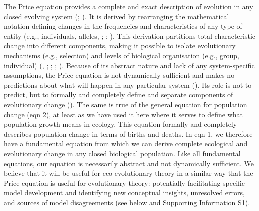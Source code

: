 \documentclass[
]{article}
\begin{document}
The Price equation provides a complete and exact description of
evolution in any closed evolving system (; ). It is derived by
rearranging the mathematical notation defining changes in the
frequencies and characteristics of any type of entity (e.g.,
individuals, alleles, ;
; ). This derivation partitions total characteristic change into
different components, making it possible to isolate evolutionary
mechanisms (e.g., selection) and levels of biological organisation
(e.g., group, individual) (,
; ; ;
). Because of its
abstract nature and lack of any system-specific assumptions, the Price
equation is not dynamically sufficient and makes no predictions about
what will happen in any particular system
(). Its role is not to predict,
but to formally and completely define and separate components of
evolutionary change (). The same is true of the general equation for population change
(eqn 2), at least as we have used it here where it serves to define what
population growth means in ecology. This equation formally and
completely describes population change in terms of births and deaths. In
eqn 1, we therefore have a fundamental equation from which we can derive
complete ecological and evolutionary change in any closed biological
population. Like all fundamental equations, our equation is necessarily
abstract and not dynamically sufficient. We believe that it will be
useful for eco-evolutionary theory in a similar way that the Price
equation is useful for evolutionary theory: potentially facilitating
specific model development and identifying new conceptual insights,
unresolved errors, and sources of model disagreements (see below and
Supporting Information S1).
\end{document}
